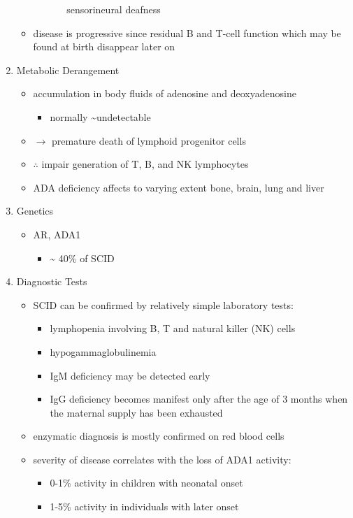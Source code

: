 \documentclass{scrartcl}
\begin{document}
\begin{enumerate}
\begin{itemize}
\begin{itemize}
\begin{itemize}
sensorineural deafness
\end{itemize}
\end{itemize}
\item disease is progressive since residual B and T-cell function which
may be found at birth disappear later on
\end{itemize}
\item Metabolic Derangement
\label{sec:org674ad2c}
\begin{itemize}
\item accumulation in body fluids of adenosine and deoxyadenosine
\begin{itemize}
\item normally \textasciitilde{}undetectable
\end{itemize}
\end{itemize}
\begin{itemize}
\item \(\to\) premature death of lymphoid progenitor cells
\item \(\therefore\) impair generation of T, B, and NK lymphocytes
\item ADA deficiency affects to varying extent bone, brain, lung and liver
\end{itemize}

\item Genetics
\label{sec:org203ad01}
\begin{itemize}
\item AR, ADA1
\begin{itemize}
\item \textasciitilde{} 40\% of SCID
\end{itemize}
\end{itemize}

\item Diagnostic Tests
\label{sec:orgd9dda8e}
\begin{itemize}
\item SCID can be confirmed by relatively simple laboratory tests:
\begin{itemize}
\item lymphopenia involving B, T and natural killer (NK) cells
\item hypogammaglobulinemia
\item IgM deficiency may be detected early
\item IgG deficiency becomes manifest only after the age of 3 months
when the maternal supply has been exhausted
\end{itemize}
\item enzymatic diagnosis is mostly confirmed on red blood cells
\item severity of disease correlates with the loss of ADA1 activity:
\begin{itemize}
\item 0-1\% activity in children with neonatal onset
\item 1-5\% activity in individuals with later onset
\end{itemize}
\end{itemize}


\end{enumerate}
\end{document}
